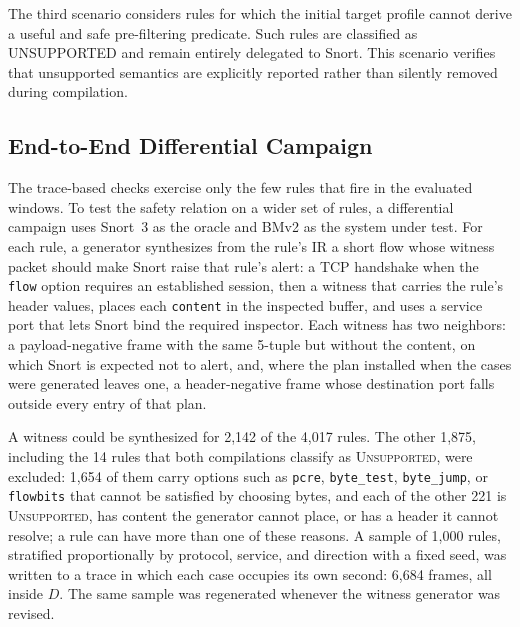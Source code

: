 \documentclass{article}
\begin{document}
The third scenario considers rules for which the initial target profile
cannot derive a useful and safe pre-filtering predicate. Such rules are
classified as UNSUPPORTED and remain entirely delegated to Snort. This
scenario verifies that unsupported semantics are explicitly reported
rather than silently removed during compilation.

\subsection{End-to-End Differential Campaign}
\label{sec:campaign-method}
The trace-based checks exercise only the few rules that fire in the evaluated
windows. To test the safety relation on a wider set of rules, a differential
campaign uses Snort~3 as the oracle and BMv2 as the system under test. For
each rule, a generator synthesizes from the rule's IR a short flow whose
witness packet should make Snort raise that rule's alert: a TCP handshake when
the \texttt{flow} option requires an established session, then a witness that
carries the rule's header values, places each \texttt{content} in the
inspected buffer, and uses a service port that lets Snort bind the required
inspector. Each witness has two neighbors: a payload-negative frame with the
same 5-tuple but without the content, on which Snort is expected not to
alert, and, where the plan installed when the cases were generated leaves
one, a header-negative frame whose destination port falls outside every entry
of that plan.

A witness could be synthesized for 2,142 of the 4,017 rules. The other 1,875,
including the 14 rules that both compilations classify as
\textsc{Unsupported}, were excluded: 1,654 of them
carry options such as \texttt{pcre}, \texttt{byte\_test}, \texttt{byte\_jump},
or \texttt{flowbits} that cannot be satisfied by choosing bytes, and each of
the other 221 is \textsc{Unsupported}, has content the generator cannot
place, or has a header it cannot resolve; a rule can have more than one of
these reasons. A
sample of 1,000 rules, stratified proportionally by protocol, service, and
direction with a fixed seed, was written to a trace in which each case
occupies its own second: 6,684 frames, all inside $D$. The same sample was
regenerated whenever the witness generator was revised.
\end{document}

